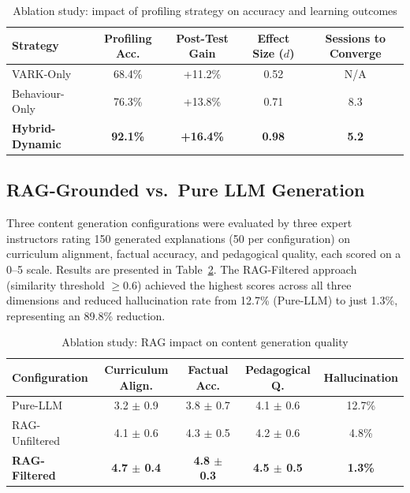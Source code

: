 \begin{table}[htb]
	\fontsize{10}{12}\selectfont
	\centering
	\caption{Ablation study: impact of profiling strategy on accuracy and learning outcomes}
	\label{tab:ablation_profiling}
	\begin{tabular}{|l|c|c|c|c|}
		\hline
		\textbf{Strategy} & \textbf{Profiling Acc.} & \textbf{Post-Test Gain} & \textbf{Effect Size ($d$)} & \textbf{Sessions to Converge} \\
		\hline
		VARK-Only        & 68.4\% & +11.2\% & 0.52 & N/A \\
		\hline
		Behaviour-Only   & 76.3\% & +13.8\% & 0.71 & 8.3 \\
		\hline
		\textbf{Hybrid-Dynamic} & \textbf{92.1\%} & \textbf{+16.4\%} & \textbf{0.98} & \textbf{5.2} \\
		\hline
	\end{tabular}
\end{table}

\subsection{RAG-Grounded vs.\ Pure LLM Generation}

Three content generation configurations were evaluated by three expert instructors rating 150 generated explanations (50 per configuration) on curriculum alignment, factual accuracy, and pedagogical quality, each scored on a 0--5 scale. Results are presented in Table~\ref{tab:ablation_rag}. The RAG-Filtered approach (similarity threshold $\geq 0.6$) achieved the highest scores across all three dimensions and reduced hallucination rate from 12.7\% (Pure-LLM) to just 1.3\%, representing an 89.8\% reduction.

\begin{table}[htb]
	\fontsize{10}{12}\selectfont
	\centering
	\caption{Ablation study: RAG impact on content generation quality}
	\label{tab:ablation_rag}
	\begin{tabular}{|l|c|c|c|c|}
		\hline
		\textbf{Configuration} & \textbf{Curriculum Align.} & \textbf{Factual Acc.} & \textbf{Pedagogical Q.} & \textbf{Hallucination} \\
		\hline
		Pure-LLM        & 3.2 $\pm$ 0.9 & 3.8 $\pm$ 0.7 & 4.1 $\pm$ 0.6 & 12.7\% \\
		\hline
		RAG-Unfiltered  & 4.1 $\pm$ 0.6 & 4.3 $\pm$ 0.5 & 4.2 $\pm$ 0.6 &  4.8\% \\
		\hline
		\textbf{RAG-Filtered} & \textbf{4.7 $\pm$ 0.4} & \textbf{4.8 $\pm$ 0.3} & \textbf{4.5 $\pm$ 0.5} & \textbf{1.3\%} \\
		\hline
	\end{tabular}
\end{table}

